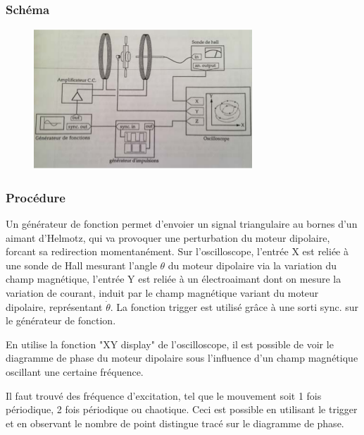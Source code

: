 \documentclass[a4paper,12pt,oneside]{article}
\begin{document}
\subsubsection{Schéma}
\begin{figure}[h!]
  \begin{center}
  \includegraphics[width=0.8\linewidth,angle=0]{./figures/moteur1.png}
  \caption{} \label{fig:}
  \end{center}
\end{figure}


\subsubsection{Procédure}

Un générateur de fonction permet d'envoier un signal triangulaire au
 bornes d'un aimant d'Helmotz, qui va provoquer une perturbation du
 moteur dipolaire, forcant sa redirection momentanément. Sur l'oscilloscope, l'entrée X est reliée à une
 sonde de Hall mesurant l'angle $\theta$ du moteur dipolaire via la variation du champ magnétique,
 l'entrée Y est reliée à un électroaimant dont on
 mesure la variation de courant, induit par le champ magnétique
 variant du moteur dipolaire, représentant $\dot{\theta}$. La fonction trigger est utilisé grâce
 à une sorti sync. sur le générateur de fonction.

En utilise la fonction "XY display" de l'oscilloscope, il est possible de voir le diagramme de phase du moteur dipolaire sous l'influence d'un champ magnétique oscillant  une certaine fréquence.

Il faut trouvé des fréquence d'excitation, tel que le mouvement soit 1 fois périodique, 2 fois périodique ou chaotique. Ceci est possible en utilisant le trigger et en observant le nombre de point distingue tracé sur le diagramme de phase.
\end{document}
